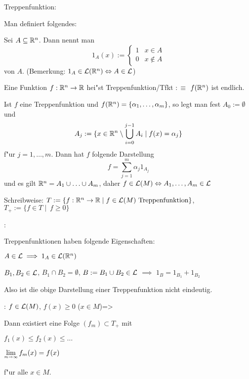  Treppenfunktion:{
  Man definiert folgendes:
  \begin{stmts}
    \item {}
      Sei $A\subseteq\mathbb R^n$. Dann nennt man
      \[1_A(x):=\begin{cases} 1 & x\in A \\ 0 & x\not\in A \end{cases}
        \]
       von $A$. 
      (Bemerkung: $1_A\in\mathcal{L}(\mathbb R^n)\Leftrightarrow A\in\mathcal{L}$)
    \item Eine Funktion $f:\mathbb R^n\to\mathbb R$ hei"st Treppenfunktion/Tfkt $:\equiv$
      $f(\mathbb R^n)$ ist endlich.
      
      Ist $f$ eine Treppenfunktion und $f(\mathbb R^n)=\{\alpha_1,\ldots,\alpha_m\}$,
      so legt man fest $A_0:=\emptyset$ und 
      \[A_j:=\{x\in\mathbb R^n\setminus \bigcup_{i=0}^{j-1} A_i \mid f(x)=\alpha_j\}
        \]
      f"ur $j=1,\ldots,m$. Dann hat $f$ folgende Darstellung
      \[f=\sum_{j=1}^m \alpha_j 1_{A_j}
        \]
      und es gilt $\mathbb R^n=A_1\cup\ldots\cup A_m$, daher 
      $f\in\mathcal{L}(M)\Leftrightarrow A_1,\ldots,A_m\in\mathcal{L}$
      
      Schreibweise: $T:=\{f:\mathbb R^n\to\mathbb R\mid f\in\mathcal{L}(M) 
        \text{ Treppenfunktion}\}$, $T_+:=\{f\in T\mid\ f \geq 0\}$
    \end{stmts}
  }
\remark:{
  Treppenfunktionen haben folgende Eigenschaften:
  \begin{stmts}
    \item $A\in\mathcal{L}\implies 1_A\in\mathcal{L}(\mathbb R^n)$
    \item $B_1,B_2\in\mathcal{L}$, $B_1\cap B_2=\emptyset$, 
      $B:=B_1\cup B_2\in\mathcal{L}$ $\implies$ $1_B=1_{B_1}+1_{B_2}$
      
      Also ist die obige Darstellung einer Treppenfunktion nicht eindeutig.
    \end{stmts}
  }
\theorem:
  $f\in\mathcal{L}(M)$, $f(x)\geq 0$ ($x\in M$)=>{
  Dann existiert eine Folge $(f_m)\subset T_+$ mit
  \begin{stmts}
    \item $f_1(x)\leq f_2(x) \leq \ldots$
    \item $\limes m->\infty f_m(x)=f(x)$
    \end{stmts}
  f"ur alle $x\in M$.
  }
